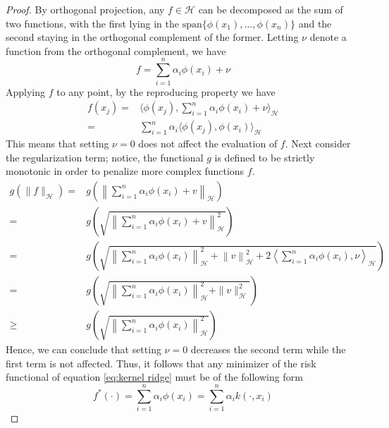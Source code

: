 \begin{proof}
    By orthogonal projection, any $f \in \mathcal{H}$ can be decomposed as the sum of two functions, with the first lying in the $\textrm{span}\{\phi(x_1),\dots, \phi(x_n)\}$ and the second staying in the orthogonal complement of the former. Letting $\nu$ denote a function from the orthogonal complement, we have
    \begin{equation}
        f=\sum\limits_{i=1}^{n}\alpha_i \phi(x_i)+\nu
    \end{equation}
    Applying $f$ to any point, by the reproducing property we have
    \begin{equation}
        \begin{aligned}
            f(x_j)=&\langle \phi(x_j), \sum\limits_{i=1}^{n}\alpha_i \phi(x_i)+\nu\rangle_{\mathcal{H}}
            \\
            =&\sum\limits_{i=1}^{n}\alpha_i\langle \phi(x_j), \phi(x_i)\rangle_{\mathcal{H}}
        \end{aligned}
    \end{equation}
    This means that setting $\nu=0$ does not affect the evaluation of $f$.
    Next consider the regularization term; notice, the functional $g$ is defined to be strictly monotonic in order to penalize more complex functions $f$.
    \begin{equation}
        \begin{aligned}
            g(\|f\|_{\mathcal{H}})=&g\left(\left\|\sum\limits_{i=1}^n \alpha_i \phi(x_i)+v\right\|_\mathcal{H}\right)
            \\
            =&g\left(\sqrt{\left\|\sum\limits_{i=1}^n \alpha_i \phi(x_i)+v\right\|_\mathcal{H}^2}\right)
            \\
            =&g\left(\sqrt{\left\|\sum\limits_{i=1}^n \alpha_i \phi(x_i)\right\|_{\mathcal{H}}^2+\left\|v\right\|_\mathcal{H}^2+2\left\langle\sum\limits_{i=1}^n \alpha_i \phi(x_i),\nu \right\rangle_{\mathcal{H}}}\right)
            \\
            =&g\left(\sqrt{\left\|\sum\limits_{i=1}^n \alpha_i \phi(x_i)\right\|_{\mathcal{H}}^2+\|v\|_\mathcal{H}^2}\right)
            \\
            \geq &g\left(\sqrt{\left\|\sum\limits_{i=1}^n \alpha_i \phi(x_i)\right\|_{\mathcal{H}}^2}\right)
        \end{aligned}
    \end{equation}
    Hence, we can conclude that setting $\nu=0$ decreases the second term while the first term is not affected. Thus, it follows that any minimizer of the risk functional of equation \ref{eq:kernel ridge} must be of the following form
    \begin{equation}
        f^*(\cdot)=\sum\limits_{i=1}^n \alpha_i \phi(x_i)=\sum\limits_{i=1}^n \alpha_i k(\cdot, x_i)
    \end{equation}
\end{proof}


